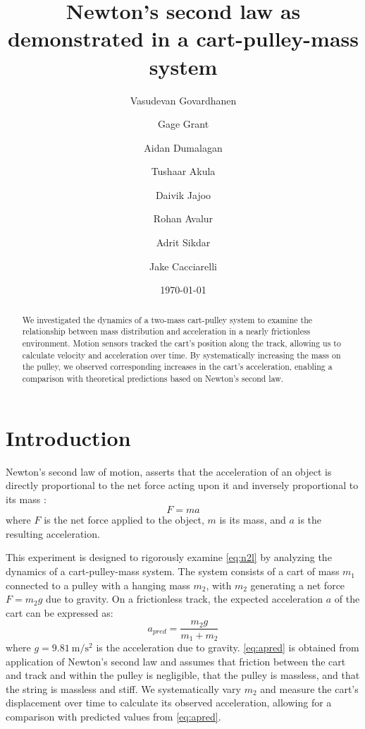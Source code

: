 ﻿\documentclass[reprint,amsmath,amssymb,aps,twoside]{revtex4-2}
\begin{document}
\setcounter{page}{15}
\title{Newton's second law as demonstrated in a cart-pulley-mass system}

\author{Vasudevan Govardhanen}
\author{Gage Grant}
\author{Aidan Dumalagan}
\author{Tushaar Akula}
\author{Daivik Jajoo}
\author{Rohan Avalur}
\author{Adrit Sikdar}
\author{Jake Cacciarelli}
\date{\today}

\begin{abstract}
We investigated the dynamics of a two-mass cart-pulley system to examine the relationship between mass distribution and acceleration in a nearly frictionless environment. Motion sensors tracked the cart’s position along the track, allowing us to calculate velocity and acceleration over time. By systematically increasing the mass on the pulley, we observed corresponding increases in the cart's acceleration, enabling a comparison with theoretical predictions based on Newton’s second law.
\end{abstract}


\maketitle\thispagestyle{mytitlepage}






\section{Introduction}
Newton's second law of motion, asserts that the acceleration of an object is directly proportional to the net force acting upon it and inversely proportional to its mass \cite{tipler}:
\begin{equation}
F = ma
\label{eq:n2l}
\end{equation}
where $F$ is the net force applied to the object, $m$ is its mass, and $a$ is the resulting acceleration.

This experiment is designed to rigorously examine \cref{eq:n2l} by analyzing the dynamics of a cart-pulley-mass system. The system consists of a cart of mass $m_1$ connected to a pulley with a hanging mass $m_2$, with $m_2$ generating a net force $F = m_2 g$ due to gravity. On a frictionless track, the expected acceleration $a$ of the cart can be expressed as:
\begin{equation}
a_{pred} = \frac{m_2 g}{m_1 + m_2}
\label{eq:apred}
\end{equation}
where $g=\qty{9.81}{\meter\per\second\squared}$ is the acceleration due to gravity. \cref{eq:apred} is obtained from application of Newton's second law and assumes that friction between the cart and track and within the pulley is negligible, that the pulley is massless, and that the string is massless and stiff. We systematically vary $m_2$ and measure the cart's displacement over time to calculate its observed acceleration, allowing for a comparison with predicted values from \cref{eq:apred}.
\end{document}
